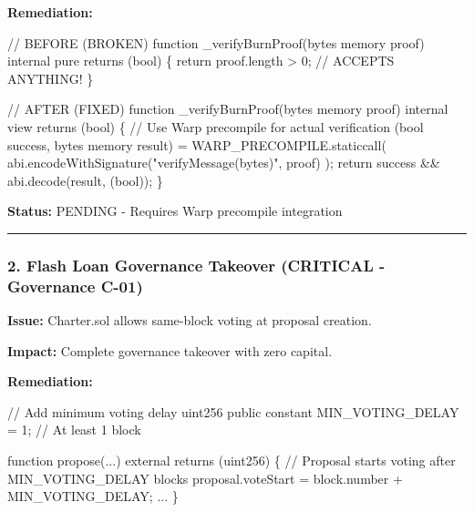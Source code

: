 \documentclass[
]{article}
\newenvironment{Shaded}{}{}
\newcommand{\NormalTok}[1]{#1}
\begin{document}
\textbf{Remediation:}

\begin{Shaded}
\begin{Highlighting}[]
\NormalTok{// BEFORE (BROKEN)}
\NormalTok{function \_verifyBurnProof(bytes memory proof) internal pure returns (bool) \{}
\NormalTok{    return proof.length \textgreater{} 0;  // ACCEPTS ANYTHING!}
\NormalTok{\}}

\NormalTok{// AFTER (FIXED)}
\NormalTok{function \_verifyBurnProof(bytes memory proof) internal view returns (bool) \{}
\NormalTok{    // Use Warp precompile for actual verification}
\NormalTok{    (bool success, bytes memory result) = WARP\_PRECOMPILE.staticcall(}
\NormalTok{        abi.encodeWithSignature("verifyMessage(bytes)", proof)}
\NormalTok{    );}
\NormalTok{    return success \&\& abi.decode(result, (bool));}
\NormalTok{\}}
\end{Highlighting}
\end{Shaded}

\textbf{Status:} PENDING - Requires Warp precompile integration

\begin{center}\rule{0.5\linewidth}{0.5pt}\end{center}

\subsubsection{2. Flash Loan Governance Takeover (CRITICAL - Governance
C-01)}\label{2-flash-loan-governance-takeover-critical---governance-c-01}

\textbf{Issue:} Charter.sol allows same-block voting at proposal
creation.

\textbf{Impact:} Complete governance takeover with zero capital.

\textbf{Remediation:}

\begin{Shaded}
\begin{Highlighting}[]
\NormalTok{// Add minimum voting delay}
\NormalTok{uint256 public constant MIN\_VOTING\_DELAY = 1; // At least 1 block}

\NormalTok{function propose(...) external returns (uint256) \{}
\NormalTok{    // Proposal starts voting after MIN\_VOTING\_DELAY blocks}
\NormalTok{    proposal.voteStart = block.number + MIN\_VOTING\_DELAY;}
\NormalTok{    ...}
\NormalTok{\}}
\end{Highlighting}
\end{Shaded}
\end{document}
